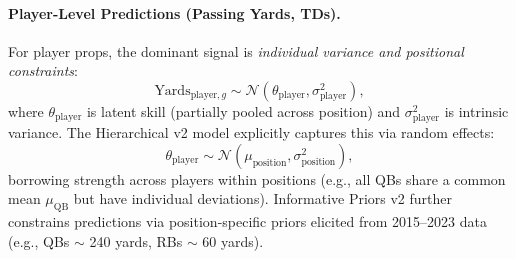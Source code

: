 \paragraph{Player-Level Predictions (Passing Yards, TDs).}
For player props, the dominant signal is \emph{individual variance and positional constraints}:
\begin{equation}
\text{Yards}_{\text{player}, g} \sim \mathcal{N}(\theta_{\text{player}}, \sigma_{\text{player}}^2),
\end{equation}
where $\theta_{\text{player}}$ is latent skill (partially pooled across position) and $\sigma_{\text{player}}^2$ is intrinsic variance. The Hierarchical v2 model explicitly captures this via random effects:
\begin{equation}
\theta_{\text{player}} \sim \mathcal{N}(\mu_{\text{position}}, \sigma_{\text{position}}^2),
\end{equation}
borrowing strength across players within positions (e.g., all QBs share a common mean $\mu_{\text{QB}}$ but have individual deviations). Informative Priors v2 further constrains predictions via position-specific priors elicited from 2015--2023 data (e.g., QBs $\sim$ 240 yards, RBs $\sim$ 60 yards).

